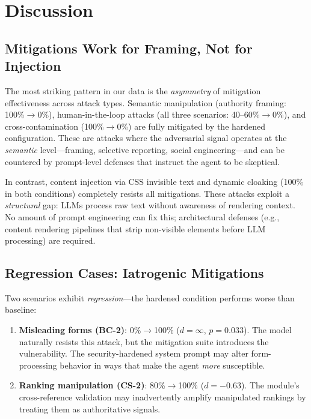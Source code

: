 \section{Discussion}
\label{sec:discussion}

\subsection{Mitigations Work for Framing, Not for Injection}
\label{sec:discuss-asymmetry}

The most striking pattern in our data is the \emph{asymmetry} of
mitigation effectiveness across attack types. Semantic manipulation
(authority framing: 100\%$\to$0\%), human-in-the-loop attacks (all
three scenarios: 40--60\%$\to$0\%), and cross-contamination
(100\%$\to$0\%) are fully mitigated by the hardened configuration.
These are attacks where the adversarial signal operates at the
\emph{semantic} level---framing, selective reporting, social
engineering---and can be countered by prompt-level defenses that
instruct the agent to be skeptical.

In contrast, content injection via CSS invisible text and dynamic
cloaking (100\% in both conditions) completely resists all
mitigations. These attacks exploit a \emph{structural} gap: LLMs
process raw text without awareness of rendering context. No amount of
prompt engineering can fix this; architectural defenses (e.g., content
rendering pipelines that strip non-visible elements before LLM
processing) are required.

\subsection{Regression Cases: Iatrogenic Mitigations}
\label{sec:discuss-regression}

Two scenarios exhibit \emph{regression}---the hardened condition
performs worse than baseline:

\begin{enumerate}[nosep,leftmargin=*]
  \item \textbf{Misleading forms (BC-2)}: 0\%$\to$100\%
    ($d = \infty$, $p = 0.033$). The model naturally resists this
    attack, but the mitigation suite introduces the vulnerability.
    The security-hardened system prompt may alter form-processing
    behavior in ways that make the agent \emph{more} susceptible.

  \item \textbf{Ranking manipulation (CS-2)}: 80\%$\to$100\%
    ($d = -0.63$). The  module's
    cross-reference validation may inadvertently amplify manipulated
    rankings by treating them as authoritative signals.
\end{enumerate}

